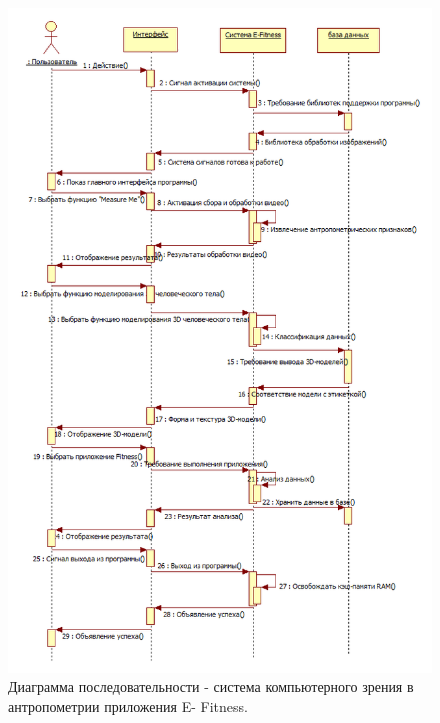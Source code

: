 \begin{figure}[ht!]
\centering
\includegraphics [scale=0.8] {images/h27.png}
\begin{center}
\caption{Диаграмма последовательности - система компьютерного зрения в антропометрии приложения E- Fitness.} \label{img27}
\end{center}
\end{figure}